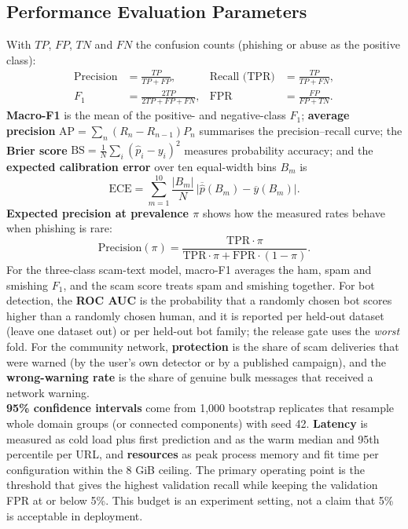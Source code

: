 \subsection{Performance Evaluation Parameters}\label{sec:metrics}
\noindent With $TP$, $FP$, $TN$ and $FN$ the confusion counts (phishing or abuse as the positive class):
\begin{align}
\text{Precision} &= \frac{TP}{TP+FP}, &
\text{Recall (TPR)} &= \frac{TP}{TP+FN},\\
F_1 &= \frac{2TP}{2TP+FP+FN}, &
\text{FPR} &= \frac{FP}{FP+TN}.
\end{align}
\noindent \textbf{Macro-F1} is the mean of the positive- and negative-class $F_1$; \textbf{average precision} $\mathrm{AP}=\sum_n (R_n-R_{n-1})P_n$ summarises the precision--recall curve; the \textbf{Brier score} $\mathrm{BS}=\frac{1}{N}\sum_i(\hat p_i-y_i)^2$ measures probability accuracy; and the \textbf{expected calibration error} over ten equal-width bins $B_m$ is
\begin{equation}\mathrm{ECE}=\sum_{m=1}^{10}\frac{|B_m|}{N}\,\big|\overline{\hat p}(B_m)-\overline{y}(B_m)\big|.\end{equation}
\textbf{Expected precision at prevalence $\pi$} shows how the measured rates behave when phishing is rare:
\begin{equation}
\text{Precision}(\pi)=\frac{\mathrm{TPR}\cdot\pi}{\mathrm{TPR}\cdot\pi+\mathrm{FPR}\cdot(1-\pi)}.
\end{equation}
For the three-class scam-text model, macro-F1 averages the ham, spam and smishing $F_1$, and the scam score treats spam and smishing together. For bot detection, the \textbf{ROC AUC} is the probability that a randomly chosen bot scores higher than a randomly chosen human, and it is reported per held-out dataset (leave one dataset out) or per held-out bot family; the release gate uses the \emph{worst} fold. For the community network, \textbf{protection} is the share of scam deliveries that were warned (by the user's own detector or by a published campaign), and the \textbf{wrong-warning rate} is the share of genuine bulk messages that received a network warning.\\

\noindent\textbf{95\% confidence intervals} come from 1,000 bootstrap replicates that resample whole domain groups (or connected components) with seed 42. \textbf{Latency} is measured as cold load plus first prediction and as the warm median and 95th percentile per URL, and \textbf{resources} as peak process memory and fit time per configuration within the 8 GiB ceiling. The primary operating point is the threshold that gives the highest validation recall while keeping the validation FPR at or below 5\%. This budget is an experiment setting, not a claim that 5\% is acceptable in deployment.

